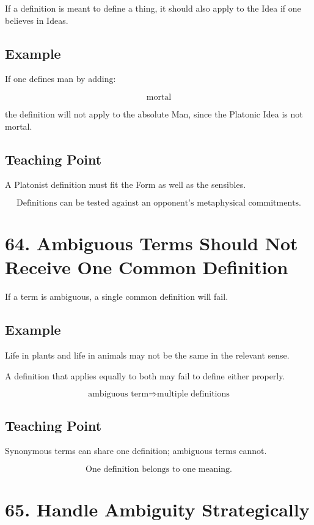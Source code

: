 \documentclass[12pt]{article}
\begin{document}
If a definition is meant to define a thing, it should also apply to the Idea if
one believes in Ideas.

\subsection*{Example}

If one defines man by adding:

\[
\text{mortal}
\]

the definition will not apply to the absolute Man, since the Platonic Idea is
not mortal.

\subsection*{Teaching Point}

A Platonist definition must fit the Form as well as the sensibles.

\[
\boxed{
\text{Definitions can be tested against an opponent's metaphysical commitments.}
}
\]

\section*{64. Ambiguous Terms Should Not Receive One Common Definition}

If a term is ambiguous, a single common definition will fail.

\subsection*{Example}

Life in plants and life in animals may not be the same in the relevant sense.

A definition that applies equally to both may fail to define either properly.

\[
\text{ambiguous term} \Rightarrow \text{multiple definitions}
\]

\subsection*{Teaching Point}

Synonymous terms can share one definition; ambiguous terms cannot.

\[
\boxed{
\text{One definition belongs to one meaning.}
}
\]

\section*{65. Handle Ambiguity Strategically}
\end{document}

